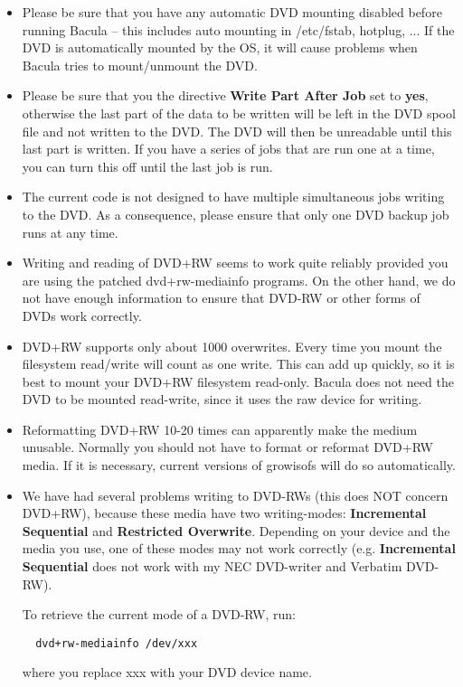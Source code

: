 \begin{itemize}
\item Please be sure that you have any automatic DVD mounting
   disabled before running Bacula -- this includes auto mounting
   in /etc/fstab, hotplug, ...  If the DVD is automatically
   mounted by the OS, it will cause problems when Bacula tries
   to mount/unmount the DVD.
\item Please be sure that you the directive {\bf Write Part After Job}
   set to {\bf yes}, otherwise the last part of the data to be
   written will be left in the DVD spool file and not written to
   the DVD. The DVD will then be unreadable until this last part
   is written.  If you have a series of jobs that are run one at
   a time, you can turn this off until the last job is run.
\item The current code is not designed to have multiple simultaneous
   jobs writing to the DVD.  As a consequence, please ensure that
   only one DVD backup job runs at any time.
\item Writing and reading of DVD+RW seems to work quite reliably
   provided you are using the patched dvd+rw-mediainfo programs.
   On the other hand, we do not have enough information to ensure
   that DVD-RW or other forms of DVDs work correctly.
\item DVD+RW supports only about 1000 overwrites. Every time you
   mount the filesystem read/write will count as one write. This can
   add up quickly, so it is best to mount your DVD+RW filesystem read-only.
   Bacula does not need the DVD to be mounted read-write, since it uses
   the raw device for writing.
\item Reformatting DVD+RW 10-20 times can apparently make the medium 
   unusable. Normally you should not have to format or reformat
   DVD+RW media. If it is necessary, current versions of growisofs will
   do so automatically.
\item We have had several problems writing to DVD-RWs (this does NOT
  concern DVD+RW), because these media have two writing-modes: {\bf
  Incremental Sequential} and {\bf Restricted Overwrite}.  Depending on
  your device and the media you use, one of these modes may not work
  correctly (e.g.  {\bf Incremental Sequential} does not work with my NEC
  DVD-writer and Verbatim DVD-RW).

  To retrieve the current mode of a DVD-RW, run:
\begin{verbatim}
  dvd+rw-mediainfo /dev/xxx
\end{verbatim}
  where you replace xxx with your DVD device name.


\end{itemize}

